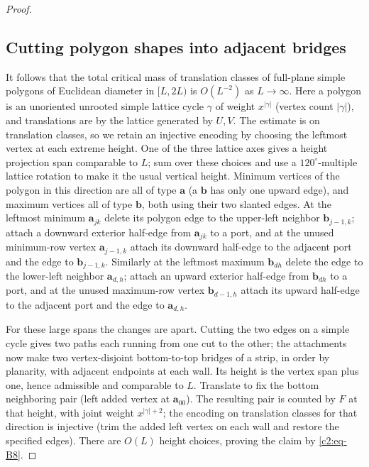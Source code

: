 \begin{proof}
\subsection{Cutting polygon shapes into adjacent bridges}
It follows that the total critical mass of translation classes of full-plane simple polygons of Euclidean diameter in \([L,2L)\) is \(O(L^{-2})\) as \(L\to\infty\). Here a polygon is an unoriented unrooted simple lattice cycle \(\gamma\) of weight \(x^{|\gamma|}\) (vertex count \(|\gamma|\)), and translations are by the lattice generated by \(U,V\). The estimate is on translation classes, so we retain an injective
encoding by choosing the leftmost vertex at each extreme height. One of the three lattice
axes gives a height projection span comparable to \(L\); sum over these choices and use a \(120^\circ\)-multiple lattice rotation to make it the usual vertical height. Minimum vertices of the polygon in this direction are all of type \(\mathbf a\) (a \(\mathbf b\) has only one upward edge), and maximum vertices all of type \(\mathbf b\), both using their two slanted edges. At the leftmost minimum \(\mathbf a_{jk}\) delete its polygon edge to the upper-left neighbor \(\mathbf b_{j-1,k}\); attach a downward exterior half-edge from \(\mathbf a_{jk}\) to a port, and at the unused minimum-row vertex \(\mathbf a_{j-1,k}\) attach its downward half-edge to the adjacent port and the edge to \(\mathbf b_{j-1,k}\). Similarly at the leftmost maximum \(\mathbf b_{dh}\) delete the edge to the lower-left neighbor \(\mathbf a_{d,h}\); attach an upward exterior half-edge from \(\mathbf b_{dh}\) to a port, and at the unused maximum-row vertex \(\mathbf b_{d-1,h}\) attach its upward half-edge to the adjacent port and the edge to \(\mathbf a_{d,h}\).

For these large spans the changes are apart. Cutting the two edges on a simple cycle gives two paths each running from one cut to the other; the attachments now make two vertex-disjoint bottom-to-top bridges of a strip, in order by planarity, with adjacent endpoints at each wall. Its height is the vertex span plus one, hence admissible and comparable to \(L\). Translate to fix the bottom neighboring pair (left added vertex at \(\mathbf a_{00}\)). The resulting pair is counted by \(F\) at that height, with joint weight \(x^{|\gamma|+2}\); the encoding on translation classes for that direction is injective (trim the added left vertex on each wall and restore the specified edges). There are \(O(L)\) height choices, proving the claim by \eqref{c2:eq-B8}.
\end{proof}

